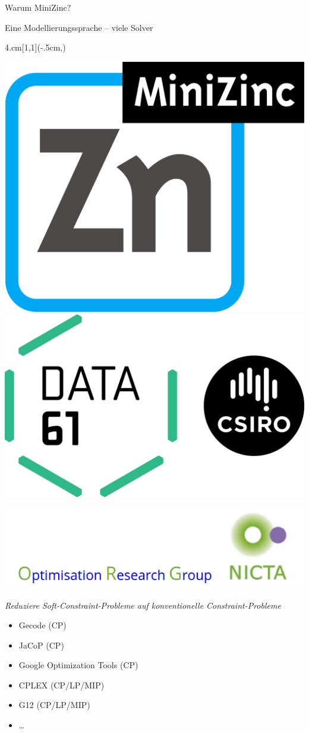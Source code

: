 \begin{frame}{Warum MiniZinc?}
\begin{parchment}[Rationale]
\centering 
\alert{Eine Modellierungssprache -- viele Solver} 
\end{parchment}

\begin{textblock*}{4.cm}[1,1](\textwidth-.5cm,\textheight-1.03cm)

\includegraphics[width=.4\textwidth]{img/MiniZn_logo.jpg}
\hfill
\includegraphics[width=.4\textwidth]{img/data61.jpg} 

\includegraphics[width=1\textwidth]{img/nictaorg.png}

\end{textblock*}
\emph{Reduziere Soft-Constraint-Probleme auf konventionelle Constraint-Probleme}

\begin{itemize}
\item Gecode (CP)
\item JaCoP (CP)
\item Google Optimization Tools (CP)
\item CPLEX (CP/LP/MIP)
\item G12 (CP/LP/MIP)
\item \ldots
\end{itemize}
\end{frame}

